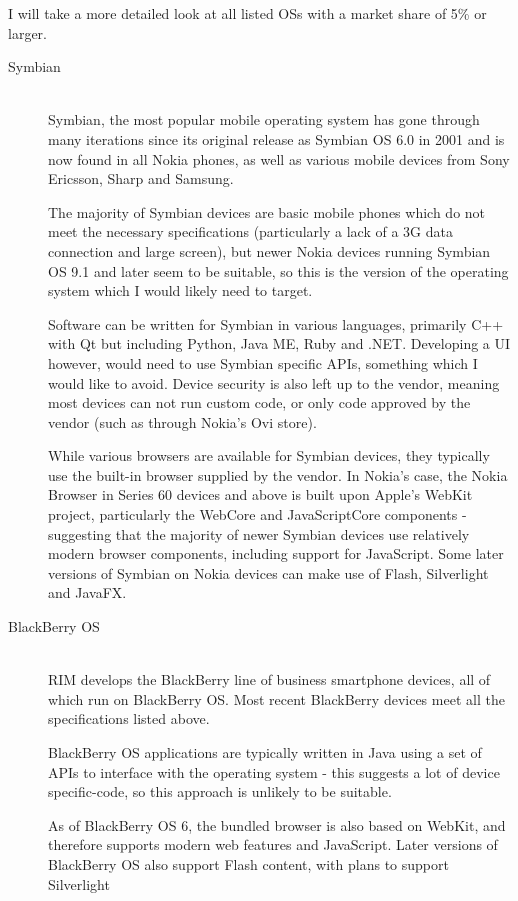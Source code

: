 \documentclass[a4papert,11pt,notitlepage]{ltxdoc}
\begin{document}
I will take a more detailed look at all listed OSs with a market share of 5\% or larger. 

\begin{description}
\item[Symbian] \hfill \\
Symbian\cite{symbian:web}, the most popular mobile operating system has gone through many iterations since its original release as Symbian OS 6.0 in 2001 and is now found in all Nokia phones, as well as various mobile devices from Sony Ericsson, Sharp and Samsung.

The majority of Symbian devices are basic mobile phones which do not meet the necessary specifications (particularly a lack of a 3G data connection and large screen), but newer Nokia devices running Symbian OS 9.1 and later seem to be suitable, so this is the version of the operating system which I would likely need to target.

Software can be written for Symbian in various languages, primarily C++ with Qt but including Python, Java ME, Ruby and .NET. Developing a UI however, would need to use Symbian specific APIs, something which I would like to avoid. Device security is also left up to the vendor, meaning most devices can not run custom code, or only code approved by the vendor (such as through Nokia's Ovi store).

While various browsers are available for Symbian devices, they typically use the built-in browser supplied by the vendor. In Nokia's case, the Nokia Browser in Series 60 devices and above is built upon Apple's WebKit project\cite{nokia:browser}, particularly the WebCore and JavaScriptCore components - suggesting that the majority of newer Symbian devices use relatively modern browser components, including support for JavaScript. Some later versions of Symbian on Nokia devices can make use of Flash, Silverlight and JavaFX.

\item[BlackBerry OS] \hfill \\
RIM develops the BlackBerry\cite{blackberry:web} line of business smartphone devices, all of which run on BlackBerry OS. Most recent BlackBerry devices meet all the specifications listed above.

BlackBerry OS applications are typically written in Java using a set of APIs to interface with the operating system - this suggests a lot of device specific-code, so this approach is unlikely to be suitable.

As of BlackBerry OS 6, the bundled browser is also based on WebKit\cite{rim:browser}, and therefore supports modern web features and JavaScript. Later versions of BlackBerry OS also support Flash content, with plans to support Silverlight


\end{description}
\end{document}
